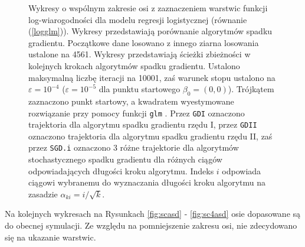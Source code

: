 \begin{figure}[h!]
\begin{center}
\begin{subfigure}[h!]{0.45\textwidth}
            \end{subfigure}
\end{center}
\caption[Porównanie algorytmów spadku gradientu o wspólnym zakresie osi.]{\label{fig:sc5asd} Wykresy o wspólnym zakresie osi z zaznaczeniem warstwic funkcji log-wiarogodności dla modelu regresji logistycznej (równanie (\ref{logglm})). Wykresy przedstawiają porównanie algorytmów spadku gradientu. Początkowe dane losowano z innego ziarna losowania ustalone na 4561. Wykresy przedstawiają ścieżki zbieżności w kolejnych krokach algorytmów spadku gradientu. Ustalono maksymalną liczbę iteracji na 10001, zaś warunek stopu ustalono na $\varepsilon=10^{-4}$ ($\varepsilon=10^{-5}$ dla punktu startowego $\beta_0 = (0,0)$). Trójkątem zaznaczono punkt startowy, a kwadratem wyestymowane rozwiązanie przy pomocy funkcji \texttt{glm} \cite{glmglm}. Przez \texttt{GDI} oznaczono trajektoria dla algorytmu spadku gradientu rzędu I, przez \texttt{GDII} oznaczono trajektoria dla algorytmu spadku gradientu rzędu II, zaś przez \texttt{SGD.i} oznaczono 3 różne trajektorie dla algorytmów stochastycznego spadku gradientu dla różnych ciągów odpowiadających długości kroku algorytmu. Indeks $i$ odpowiada ciągowi wybranemu do wyznaczania długości kroku algorytmu na zasadzie $\alpha_{ki} = i/\sqrt{k}$.}
\end{figure}

Na kolejnych wykresach na Rysunkach \ref{fig:scasd} - \ref{fig:sc4asd} osie dopasowane są do obecnej symulacji. Ze względu na pomniejszenie zakresu osi, nie zdecydowano się na ukazanie warstwic.

\newpage

